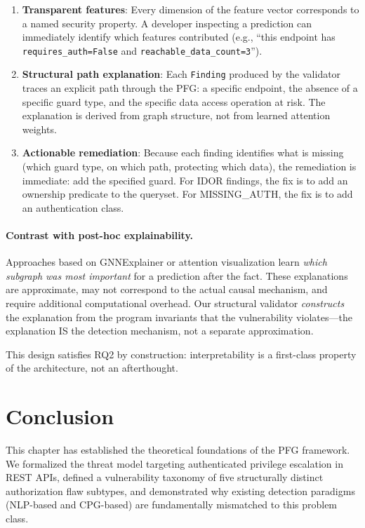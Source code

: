 \begin{enumerate}
    \item \textbf{Transparent features}: Every dimension of the feature vector corresponds to a named security property. A developer inspecting a prediction can immediately identify which features contributed (e.g., ``this endpoint has \texttt{requires\_auth=False} and \texttt{reachable\_data\_count=3}'').

    \item \textbf{Structural path explanation}: Each \texttt{Finding} produced by the validator traces an explicit path through the PFG: a specific endpoint, the absence of a specific guard type, and the specific data access operation at risk. The explanation is derived from graph structure, not from learned attention weights.

    \item \textbf{Actionable remediation}: Because each finding identifies what is missing (which guard type, on which path, protecting which data), the remediation is immediate: add the specified guard. For IDOR findings, the fix is to add an ownership predicate to the queryset. For MISSING\_AUTH, the fix is to add an authentication class.
\end{enumerate}

\paragraph{Contrast with post-hoc explainability.} Approaches based on GNNExplainer \cite{ying2019gnnexplainer} or attention visualization learn \emph{which subgraph was most important} for a prediction after the fact. These explanations are approximate, may not correspond to the actual causal mechanism, and require additional computational overhead. Our structural validator \emph{constructs} the explanation from the program invariants that the vulnerability violates—the explanation IS the detection mechanism, not a separate approximation.

This design satisfies RQ2 by construction: interpretability is a first-class property of the architecture, not an afterthought.

\section{Conclusion}
\label{sec:ch3-conclusion}

This chapter has established the theoretical foundations of the PFG framework. We formalized the threat model targeting authenticated privilege escalation in REST APIs, defined a vulnerability taxonomy of five structurally distinct authorization flaw subtypes, and demonstrated why existing detection paradigms (NLP-based and CPG-based) are fundamentally mismatched to this problem class.

